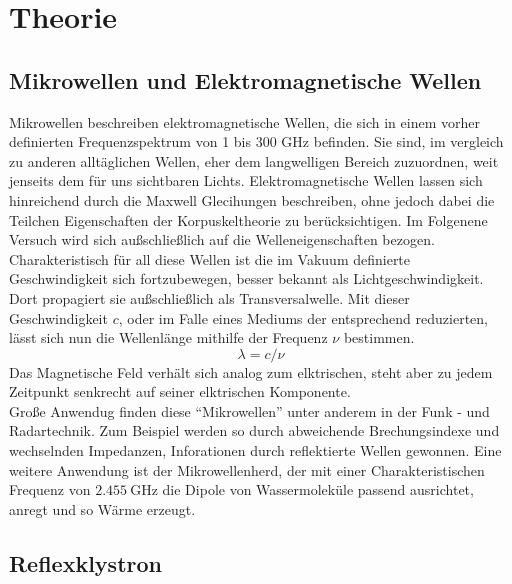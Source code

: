 \section{Theorie}

\subsection{Mikrowellen und Elektromagnetische Wellen }
Mikrowellen beschreiben elektromagnetische Wellen, die sich in einem vorher definierten Frequenzspektrum von 1 bis 300 $\si{\giga\hertz}$ befinden. 
Sie sind, im vergleich zu anderen alltäglichen Wellen, eher dem langwelligen Bereich zuzuordnen, weit jenseits dem für uns sichtbaren Lichts.
Elektromagnetische Wellen lassen sich hinreichend durch die Maxwell Glecihungen beschreiben, ohne jedoch dabei die Teilchen Eigenschaften der Korpuskeltheorie zu berücksichtigen. Im Folgenene Versuch wird sich außschließlich auf die Welleneigenschaften bezogen.
Charakteristisch für all diese Wellen ist die im Vakuum definierte Geschwindigkeit sich fortzubewegen, besser bekannt als Lichtgeschwindigkeit. Dort propagiert sie außschließlich als Transversalwelle.
Mit dieser Geschwindigkeit $c$, oder im Falle eines Mediums der entsprechend reduzierten, lässt sich nun die Wellenlänge mithilfe der Frequenz $\nu$ bestimmen.
\begin{equation}
    \label{eqn:1}
\lambda = c/{\nu}
\end{equation}
Das Magnetische Feld verhält sich analog zum elktrischen, steht aber zu jedem Zeitpunkt senkrecht auf seiner elktrischen Komponente. \\  Große Anwendug 
finden diese \enquote{Mikrowellen} unter anderem in der Funk - und Radartechnik. Zum Beispiel werden so durch abweichende Brechungsindexe und wechselnden Impedanzen,  Inforationen durch reflektierte Wellen gewonnen. 
Eine weitere Anwendung ist der Mikrowellenherd, der mit einer Charakteristischen Frequenz von $\SI{2.455}{\giga\hertz}$ die Dipole von Wassermoleküle passend ausrichtet, anregt und so Wärme erzeugt.

\subsection{Reflexklystron}


